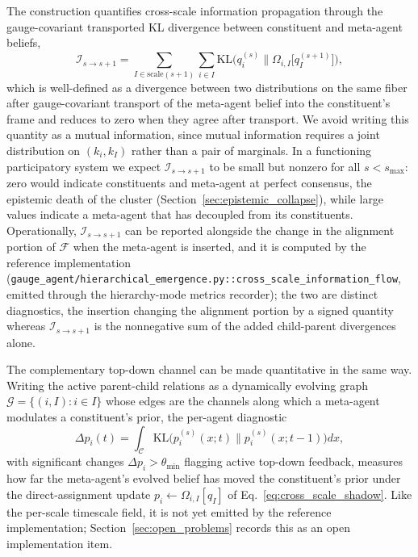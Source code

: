 \documentclass[11pt]{article}
\begin{document}
The construction quantifies cross-scale information propagation through the gauge-covariant transported KL divergence between constituent and meta-agent beliefs,
\begin{equation}
\mathcal{I}_{s \to s+1} = \sum_{I \in \mathrm{scale}(s+1)} \sum_{i \in I} \mathrm{KL}\big(q_i^{(s)} \big\| \Omega_{i,I}\big[q_I^{(s+1)}\big]\big),
\label{eq:cross_scale_information_flow}
\end{equation}
which is well-defined as a divergence between two distributions on the same fiber after gauge-covariant transport of the meta-agent belief into the constituent's frame and reduces to zero when they agree after transport. We avoid writing this quantity as a mutual information, since mutual information requires a joint distribution on $(k_i, k_I)$ rather than a pair of marginals. In a functioning participatory system we expect $\mathcal{I}_{s \to s+1}$ to be small but nonzero for all $s < s_{\max}$: zero would indicate constituents and meta-agent at perfect consensus, the epistemic death of the cluster (Section~\ref{sec:epistemic_collapse}), while large values indicate a meta-agent that has decoupled from its constituents. Operationally, $\mathcal{I}_{s \to s+1}$ can be reported alongside the change in the alignment portion of $\mathcal{F}$ when the meta-agent is inserted, and it is computed by the reference implementation (\texttt{gauge\_agent/hierarchical\_emergence.py::cross\_scale\_information\_flow}, emitted through the hierarchy-mode metrics recorder); the two are distinct diagnostics, the insertion changing the alignment portion by a signed quantity whereas $\mathcal{I}_{s \to s+1}$ is the nonnegative sum of the added child-parent divergences alone.

The complementary top-down channel can be made quantitative in the same way. Writing the active parent-child relations as a dynamically evolving graph $\mathcal{G} = \{(i, I) : i \in I\}$ whose edges are the channels along which a meta-agent modulates a constituent's prior, the per-agent diagnostic
\begin{equation}
\Delta p_i(t) = \int_{\mathcal{C}} \mathrm{KL}\big(p_i^{(s)}(x; t) \big\| p_i^{(s)}(x; t-1)\big)  dx,
\label{eq:topdown_influence}
\end{equation}
with significant changes $\Delta p_i > \theta_{\min}$ flagging active top-down feedback, measures how far the meta-agent's evolved belief has moved the constituent's prior under the direct-assignment update $p_i \leftarrow \Omega_{i,I}[q_I]$ of Eq.~\eqref{eq:cross_scale_shadow}. Like the per-scale timescale field, it is not yet emitted by the reference implementation; Section~\ref{sec:open_problems} records this as an open implementation item.
\end{document}
